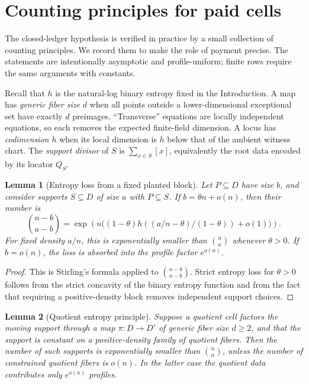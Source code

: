 \documentclass[12pt,a4paper]{amsart}
\numberwithin{equation}{section}
\newtheorem{lemma}[lemma]{Lemma}
\theoremstyle{remark}
\begin{document}
\section{Counting principles for paid cells}\label{sec:payment-principles}

The closed-ledger hypothesis is verified in practice by a small collection of counting principles.  We record them to make the role of payment precise.  The statements are intentionally asymptotic and profile-uniform; finite rows require the same arguments with constants.

Recall that \(h\) is the natural-log binary entropy fixed in the
Introduction.  A map has \emph{generic fiber size} \(d\) when all points
outside a lower-dimensional exceptional set have exactly \(d\) preimages.
``Transverse'' equations are locally independent equations, so each removes
the expected finite-field dimension.  A locus has \emph{codimension
\(h\)} when its local dimension is \(h\) below that of the ambient witness
chart.  The \emph{support divisor} of \(S\) is
\(\sum_{x\in S}[x]\), equivalently the root data encoded by its locator
\(Q_S\).

\begin{lemma}[Entropy loss from a fixed planted block]\label{lem:planted-entropy}
Let \(P\subseteq D\) have size \(b\), and consider supports \(S\subseteq D\) of size \(a\) with \(P\subseteq S\).  If \(b=\theta n+o(n)\), then their number is
\[
        \binom{n-b}{a-b}
        =\exp\left(n\bigl((1-\theta)h((a/n-\theta)/(1-\theta))+o(1)\bigr)\right).
\]
For fixed density \(a/n\), this is exponentially smaller than \(\binom na\) whenever \(\theta>0\).  If \(b=o(n)\), the loss is absorbed into the profile factor \(e^{o(n)}\).
\end{lemma}

\begin{proof}
This is Stirling's formula applied to \(\binom{n-b}{a-b}\).  Strict entropy loss for \(\theta>0\) follows from the strict concavity of the binary entropy function and from the fact that requiring a positive-density block removes independent support choices.
\end{proof}

\begin{lemma}[Quotient entropy principle]\label{lem:quotient-entropy}
Suppose a quotient cell factors the moving support through a map \(\pi:D\to D'\) of generic fiber size \(d\ge2\), and that the support is constant on a positive-density family of quotient fibers.  Then the number of such supports is exponentially smaller than \(\binom na\), unless the number of constrained quotient fibers is \(o(n)\).  In the latter case the quotient data contributes only \(e^{o(n)}\) profiles.
\end{lemma}
\end{document}

